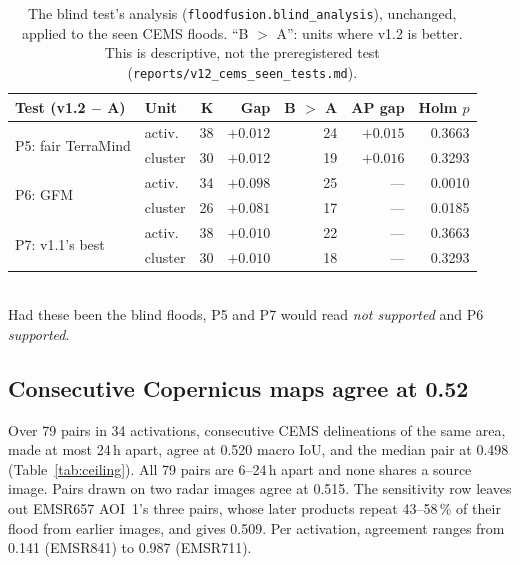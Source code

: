 \documentclass[10pt,twocolumn,a4paper]{article}
\newcommand{\file}[1]{\nolinkurl{#1}}
\newcommand{\pp}{\,\%}
\begin{document}
\begin{table}[t]
\centering\small
\caption{The blind test's analysis (\file{floodfusion.blind_analysis}), unchanged, applied to the seen CEMS
floods. ``B $>$ A'': units where v1.2 is better. This is descriptive, not the preregistered test
(\file{reports/v12_cems_seen_tests.md}).}
\label{tab:seen}
\setlength{\tabcolsep}{2.5pt}
\begin{tabular}{@{}l l r r r r r@{}}
\toprule
Test (v1.2 $-$ A) & Unit & K & Gap & B $>$ A & AP gap & Holm $p$ \\
\midrule
\multirow{2}{*}{P5: fair TerraMind} & activ. & 38 & $+0.012$ & 24 & $+0.015$ & 0.3663 \\
                                    & cluster & 30 & $+0.012$ & 19 & $+0.016$ & 0.3293 \\
\multirow{2}{*}{P6: GFM}            & activ. & 34 & $+0.098$ & 25 & --- & 0.0010 \\
                                    & cluster & 26 & $+0.081$ & 17 & --- & 0.0185 \\
\multirow{2}{*}{P7: v1.1's best}    & activ. & 38 & $+0.010$ & 22 & --- & 0.3663 \\
                                    & cluster & 30 & $+0.010$ & 18 & --- & 0.3293 \\
\bottomrule
\end{tabular}
\\[3pt]
\footnotesize Had these been the blind floods, P5 and P7 would read \emph{not supported} and P6 \emph{supported}.
\end{table}

\subsection{Consecutive Copernicus maps agree at 0.52}\label{sec:ceiling}
Over 79 pairs in 34 activations, consecutive CEMS delineations of the same area, made at most 24\,h apart, agree at
0.520 macro IoU, and the median pair at 0.498 (Table~\ref{tab:ceiling}). All 79 pairs are 6--24\,h apart and none shares a
source image. Pairs drawn on two radar images agree at 0.515. The sensitivity row leaves out EMSR657 AOI~1's three
pairs, whose later products repeat 43--58\pp{} of their flood from earlier images, and gives 0.509. Per activation,
agreement ranges from 0.141 (EMSR841) to 0.987 (EMSR711).
\end{document}
